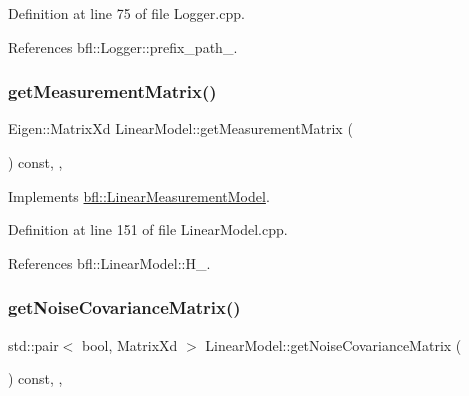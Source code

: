 Definition at line 75 of file Logger.\+cpp.



References bfl\+::\+Logger\+::prefix\+\_\+path\+\_\+.

\mbox{\label{classbfl_1_1LinearModel_a7dbfa7e8cbdc9ee863febf92e6046400}} 
\subsubsection{\texorpdfstring{get\+Measurement\+Matrix()}{getMeasurementMatrix()}}
{\footnotesize\ttfamily Eigen\+::\+Matrix\+Xd Linear\+Model\+::get\+Measurement\+Matrix (\begin{DoxyParamCaption}{ }\end{DoxyParamCaption}) const\hspace{0.3cm}{\ttfamily [override]}, {\ttfamily [virtual]}, {\ttfamily [inherited]}}



Implements \mbox{\hyperlink{classbfl_1_1LinearMeasurementModel_a719734ef024a766f03b86e51dc849953}{bfl\+::\+Linear\+Measurement\+Model}}.



Definition at line 151 of file Linear\+Model.\+cpp.



References bfl\+::\+Linear\+Model\+::\+H\+\_\+.

\mbox{\label{classbfl_1_1LinearModel_a9adc7aabd58e79ce71c283866ddbf655}} 
\subsubsection{\texorpdfstring{get\+Noise\+Covariance\+Matrix()}{getNoiseCovarianceMatrix()}}
{\footnotesize\ttfamily std\+::pair$<$ bool, Matrix\+Xd $>$ Linear\+Model\+::get\+Noise\+Covariance\+Matrix (\begin{DoxyParamCaption}{ }\end{DoxyParamCaption}) const\hspace{0.3cm}{\ttfamily [override]}, {\ttfamily [virtual]}, {\ttfamily [inherited]}}



